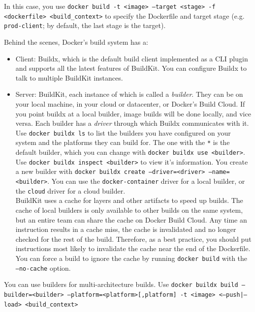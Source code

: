 \documentclass[table, xcdraw]{article}%
\begin{document}
In this case, you use \texttt{docker build -t <image> --target <stage> -f <dockerfile> <build_context>} to specify the Dockerfile and target stage (e.g. \texttt{prod-client}; by default, the last stage is the target).

Behind the scenes, Docker’s build system has a:

\begin{itemize}
    \item Client: Buildx, which is the default build client implemented as a CLI plugin and supports all the latest features of BuildKit. You can configure Buildx to talk to multiple BuildKit instances.
    \item Server: BuildKit, each instance of which is called a \emph{builder}. They can be on your local machine, in your cloud or datacenter, or Docker’s Build Cloud. If you point buildx at a local builder, image builds will be done locally, and vice versa. Each builder has a \emph{driver} through which Buildx communicates with it. Use \texttt{docker buildx ls} to list the builders you have configured on your system and the platforms they can build for. The one with the \texttt{*} is the default builder, which you can change with \texttt{docker buildx use <builder>}. Use \texttt{docker buildx inspect <builder>} to view it's information. You create a new builder with \texttt{docker buildx create --driver=<driver> --name=<builder>}. You can use the \texttt{docker-container} driver for a local builder, or the \texttt{cloud} driver for a cloud builder.\\
    BuildKit uses a cache for layers and other artifacts to speed up builds. The cache of local builders is only available to other builds on the same system, but an entire team can share the cache on Docker Build Cloud. Any time an instruction results in a cache miss, the cache is invalidated and no longer checked for the rest of the build. Therefore, as a best practice, you should put instructions most likely to invalidate the cache near the end of the Dockerfile. You can force a build to ignore the cache by running \texttt{docker build} with the \texttt{--no-cache} option.
\end{itemize}

You can use builders for multi-architecture builds. Use \texttt{docker buildx build --builder=<builder> --platform=<platform>[,platform] -t <image> <--push|--load> <build_context>}
\end{document}
